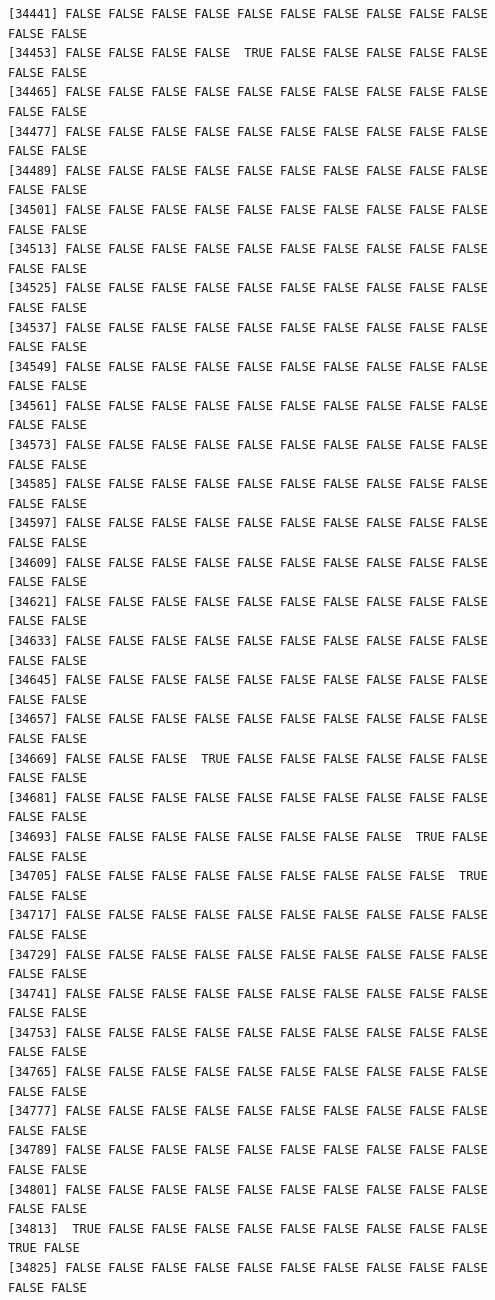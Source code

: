 \documentclass[
  a4paper,
  DIV=11,
  numbers=noendperiod]{scrartcl}
\begin{document}
\begin{verbatim}
[34441] FALSE FALSE FALSE FALSE FALSE FALSE FALSE FALSE FALSE FALSE FALSE FALSE
[34453] FALSE FALSE FALSE FALSE  TRUE FALSE FALSE FALSE FALSE FALSE FALSE FALSE
[34465] FALSE FALSE FALSE FALSE FALSE FALSE FALSE FALSE FALSE FALSE FALSE FALSE
[34477] FALSE FALSE FALSE FALSE FALSE FALSE FALSE FALSE FALSE FALSE FALSE FALSE
[34489] FALSE FALSE FALSE FALSE FALSE FALSE FALSE FALSE FALSE FALSE FALSE FALSE
[34501] FALSE FALSE FALSE FALSE FALSE FALSE FALSE FALSE FALSE FALSE FALSE FALSE
[34513] FALSE FALSE FALSE FALSE FALSE FALSE FALSE FALSE FALSE FALSE FALSE FALSE
[34525] FALSE FALSE FALSE FALSE FALSE FALSE FALSE FALSE FALSE FALSE FALSE FALSE
[34537] FALSE FALSE FALSE FALSE FALSE FALSE FALSE FALSE FALSE FALSE FALSE FALSE
[34549] FALSE FALSE FALSE FALSE FALSE FALSE FALSE FALSE FALSE FALSE FALSE FALSE
[34561] FALSE FALSE FALSE FALSE FALSE FALSE FALSE FALSE FALSE FALSE FALSE FALSE
[34573] FALSE FALSE FALSE FALSE FALSE FALSE FALSE FALSE FALSE FALSE FALSE FALSE
[34585] FALSE FALSE FALSE FALSE FALSE FALSE FALSE FALSE FALSE FALSE FALSE FALSE
[34597] FALSE FALSE FALSE FALSE FALSE FALSE FALSE FALSE FALSE FALSE FALSE FALSE
[34609] FALSE FALSE FALSE FALSE FALSE FALSE FALSE FALSE FALSE FALSE FALSE FALSE
[34621] FALSE FALSE FALSE FALSE FALSE FALSE FALSE FALSE FALSE FALSE FALSE FALSE
[34633] FALSE FALSE FALSE FALSE FALSE FALSE FALSE FALSE FALSE FALSE FALSE FALSE
[34645] FALSE FALSE FALSE FALSE FALSE FALSE FALSE FALSE FALSE FALSE FALSE FALSE
[34657] FALSE FALSE FALSE FALSE FALSE FALSE FALSE FALSE FALSE FALSE FALSE FALSE
[34669] FALSE FALSE FALSE  TRUE FALSE FALSE FALSE FALSE FALSE FALSE FALSE FALSE
[34681] FALSE FALSE FALSE FALSE FALSE FALSE FALSE FALSE FALSE FALSE FALSE FALSE
[34693] FALSE FALSE FALSE FALSE FALSE FALSE FALSE FALSE  TRUE FALSE FALSE FALSE
[34705] FALSE FALSE FALSE FALSE FALSE FALSE FALSE FALSE FALSE  TRUE FALSE FALSE
[34717] FALSE FALSE FALSE FALSE FALSE FALSE FALSE FALSE FALSE FALSE FALSE FALSE
[34729] FALSE FALSE FALSE FALSE FALSE FALSE FALSE FALSE FALSE FALSE FALSE FALSE
[34741] FALSE FALSE FALSE FALSE FALSE FALSE FALSE FALSE FALSE FALSE FALSE FALSE
[34753] FALSE FALSE FALSE FALSE FALSE FALSE FALSE FALSE FALSE FALSE FALSE FALSE
[34765] FALSE FALSE FALSE FALSE FALSE FALSE FALSE FALSE FALSE FALSE FALSE FALSE
[34777] FALSE FALSE FALSE FALSE FALSE FALSE FALSE FALSE FALSE FALSE FALSE FALSE
[34789] FALSE FALSE FALSE FALSE FALSE FALSE FALSE FALSE FALSE FALSE FALSE FALSE
[34801] FALSE FALSE FALSE FALSE FALSE FALSE FALSE FALSE FALSE FALSE FALSE FALSE
[34813]  TRUE FALSE FALSE FALSE FALSE FALSE FALSE FALSE FALSE FALSE  TRUE FALSE
[34825] FALSE FALSE FALSE FALSE FALSE FALSE FALSE FALSE FALSE FALSE FALSE FALSE

\end{verbatim}
\end{document}
